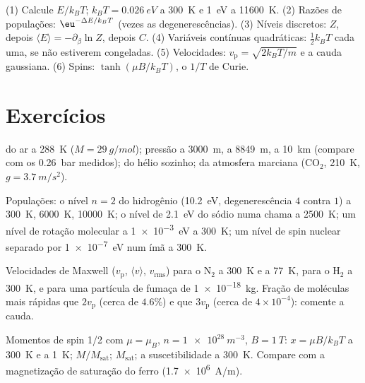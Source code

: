 \begin{method}\label{meth:b2:boltzmann-factor:method}
(1) Calcule $E/k_BT$; $k_BT = \qty{0.026}{eV}$ a \qty{300}{K} e \qty{1}{eV}
a \qty{11600}{K}. (2) Razões de populações: $\eu^{-\Delta E/k_BT}$ (vezes as
degenerescências). (3) Níveis discretos: $Z$, depois $\langle E\rangle =
-\partial_\beta\ln Z$, depois $C$. (4) Variáveis contínuas quadráticas:
$\tfrac12k_BT$ cada uma, se não estiverem congeladas. (5) Velocidades: $v_{\text{p}} = \sqrt{2k_BT/m}$
e a cauda gaussiana. (6) Spins: $\tanh(\mu B/k_BT)$, o $1/T$ de Curie.
\end{method}

\section{Exercícios}

\begin{exercise}[$\star$]\label{exo:b2:boltzmann-factor:1}
 do ar a \qty{288}{K} ($M = \qty{29}{g/mol}$); pressão a
\qty{3000}{m}, a \qty{8849}{m}, a \qty{10}{km} (compare com os
\qty{0.26}{bar} medidos);  do hélio sozinho; da atmosfera marciana
(CO$_2$, \qty{210}{K}, $g = \qty{3.7}{m/s^2}$).
\end{exercise}

\begin{exercise}[$\star$]\label{exo:b2:boltzmann-factor:2}
Populações: o nível $n = 2$ do hidrogênio (\qty{10.2}{eV}, degenerescência $4$
contra $1$) a \qty{300}{K}, \qty{6000}{K}, \qty{10000}{K}; o nível de
\qty{2.1}{eV} do sódio numa chama a \qty{2500}{K}; um nível de rotação molecular a
\qty{1e-3}{eV} a \qty{300}{K}; um nível de spin nuclear separado por \qty{1e-7}{eV} num
ímã a \qty{300}{K}.
\end{exercise}

\begin{exercise}[$\star$]\label{exo:b2:boltzmann-factor:3}
Velocidades de Maxwell ($v_{\text{p}}$, $\langle v\rangle$, $v_{\text{rms}}$) para o N$_2$
a \qty{300}{K} e a \qty{77}{K}, para o H$_2$ a \qty{300}{K}, e para uma partícula
de fumaça de \qty{1e-18}{kg}. Fração de moléculas mais rápidas que $2v_{\text{p}}$
(cerca de $4.6\%$) e que $3v_{\text{p}}$ (cerca de $4 \times 10^{-4}$): comente
a cauda.
\end{exercise}

\begin{exercise}[$\star$]\label{exo:b2:boltzmann-factor:4}
Momentos de spin 1/2 com $\mu = \mu_B$, $n = \qty{1e28}{m^{-3}}$, $B = \qty{1}{T}$:
$x = \mu B/k_BT$ a \qty{300}{K} e a \qty{1}{K}; $M/M_{\text{sat}}$; $M_{\text{sat}}$;
a suscetibilidade a \qty{300}{K}. Compare com a magnetização de saturação
do ferro (\qty{1.7e6}{A/m}).
\end{exercise}

